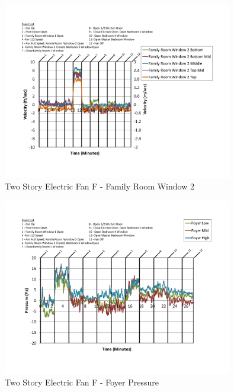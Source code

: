 \documentclass{article}
\begin{document}
\begin{appendices}
	\begin{figure}[H]
		\centering
		\includegraphics[height=3.05in,trim=0.67in 1.1in 0.67in 0.8in,clip=true]{0_Images/Results_Charts/ColdFlow/Two_Story/Electric/F/Family_Room_Window_2.pdf}
		\caption{Two Story Electric Fan F - Family Room Window 2}
	\end{figure}
 

	\begin{figure}[H]
		\centering
		\includegraphics[height=3.05in,trim=0.67in 1.1in 0.67in 0.8in,clip=true]{0_Images/Results_Charts/ColdFlow/Two_Story/Electric/F/Foyer_Pressure.pdf}
		\caption{Two Story Electric Fan F - Foyer Pressure}
	\end{figure}
 
	\clearpage


\end{appendices}
\end{document}
